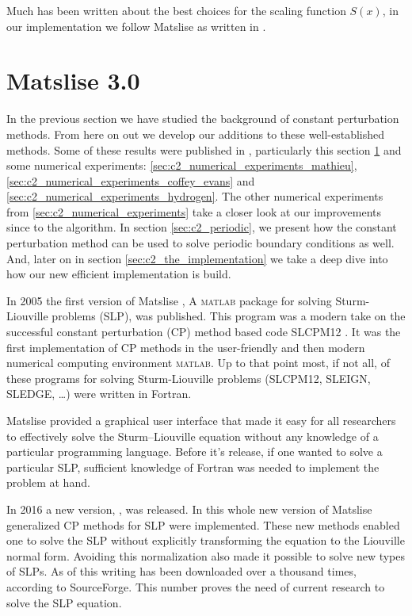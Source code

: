 Much has been written  about the best choices for the scaling function $S(x)$, in our implementation we follow Matslise as written in \cite{ledoux_study_2007}.

\section{Matslise 3.0}\label{sec:c2_matslise3}

In the previous section we have studied the background of constant perturbation methods. From here on out we develop our additions to these well-established methods. Some of these results were published in \cite{baeyens_fast_2020}, particularly this section \ref{sec:c2_matslise3} and some numerical experiments: \ref{sec:c2_numerical_experiments_mathieu}, \ref{sec:c2_numerical_experiments_coffey_evans} and \ref{sec:c2_numerical_experiments_hydrogen}. The other numerical experiments from \ref{sec:c2_numerical_experiments} take a closer look at our improvements since \cite{baeyens_fast_2020} to the algorithm. In section \ref{sec:c2_periodic}, we present how the constant perturbation method can be used to solve periodic boundary conditions as well. And, later on in section \ref{sec:c2_the_implementation} we take a deep dive into how our new efficient implementation is build.

In 2005 the first version of Matslise \cite{ledoux_matslise_2005}, A \textsc{matlab} package for solving Sturm-Liouville problems (SLP), was published. This program was a modern take on the successful
constant perturbation (CP) method based code SLCPM12 \cite{ixaru_slcpm12_1999}. It was the first implementation of CP
methods in the user-friendly and then modern numerical computing environment \textsc{matlab}. Up to that
point most, if not all, of these programs for solving Sturm-Liouville problems (SLCPM12, SLEIGN, SLEDGE, \ldots) \cite{ixaru_slcpm12_1999,bailey_sleign2_2001,eastham_sledge_1996}
were written in Fortran.

Matslise provided a graphical user interface that made it easy for all
researchers to effectively solve the
Sturm--Liouville equation without any knowledge of a particular programming language. Before it's release, if one wanted to solve
a particular SLP, sufficient knowledge of Fortran was needed to implement the problem at hand.

In 2016 a new version, \cite{ledoux_matslise_2016}, was released. In this whole new version of Matslise generalized CP methods for SLP were implemented. These new methods enabled one to solve the SLP without explicitly transforming the equation to the Liouville normal form. Avoiding this normalization also made it possible to solve new types of SLPs. As of this writing  has been downloaded over a thousand times, according to SourceForge. This number proves the need of current research to solve the SLP equation.


